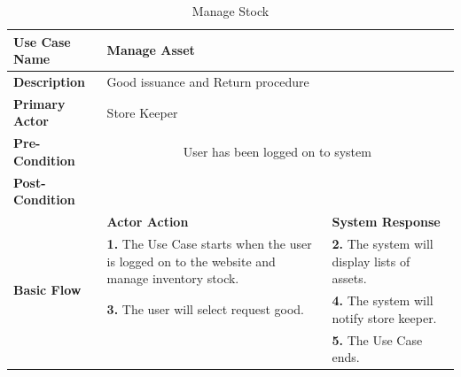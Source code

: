 \begin{table}[!h]
\begin{tabular}{|l|p{6cm}|p{6cm}|}
\hline 
\rule[-1ex]{0pt}{2.5ex} \textbf{Use Case Name} & \multicolumn{2}{p{10cm}|}{Manage Asset} \\ 
\hline 
\rule[-1ex]{0pt}{2.5ex} \textbf{Description} &\multicolumn{2}{p{10cm}|}{Good issuance
and Return procedure} \\ 
\hline 
\rule[-1ex]{0pt}{2.5ex} \textbf{Primary Actor}& \multicolumn{2}{p{10cm}|}{Store Keeper} \\ 
\hline 
\rule[-1ex]{0pt}{2.5ex} \textbf{Pre-Condition} & \multicolumn{2}{c|}{User has been logged on to system} \\ 
\hline 
\rule[-1ex]{0pt}{2.5ex} \textbf{Post-Condition} & \multicolumn{2}{p{10cm}|}{}  \\ 
\hline 
\multirow{4}{*}{\textbf{Basic Flow}} & \textbf{Actor Action} & \textbf{System Response}\\
\cline{2-3}
%
&
\textbf{1.}  The Use Case starts when the user is logged on to the website and manage inventory stock.
& 
\textbf{2.}  The system will display lists of assets.
\\
%
&
\textbf{3.}  The user will select request good.
& 
\textbf{4.}  The system will notify store keeper. 
\\
%
&

& 
\textbf{5.}  The Use Case ends. 
\\
\hline
\end{tabular}
\caption{Manage Stock} 
\end{table}



